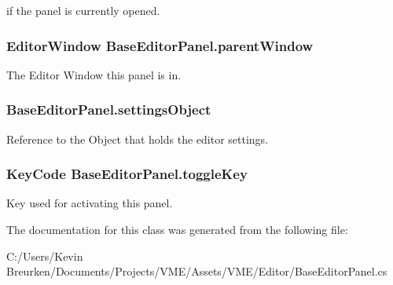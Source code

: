 if the panel is currently opened. 

\subsubsection[{\texorpdfstring{parent\+Window}{parentWindow}}]{\setlength{\rightskip}{0pt plus 5cm}Editor\+Window Base\+Editor\+Panel.\+parent\+Window}\hypertarget{class_base_editor_panel_a9b10134d16fca13b5c9b400ccbd06543}{}\label{class_base_editor_panel_a9b10134d16fca13b5c9b400ccbd06543}


The Editor Window this panel is in. 

\subsubsection[{\texorpdfstring{settings\+Object}{settingsObject}}]{ Base\+Editor\+Panel.\+settings\+Object}\hypertarget{class_base_editor_panel_a4b4881caa31e3604aaaa5f6914405e8a}{}\label{class_base_editor_panel_a4b4881caa31e3604aaaa5f6914405e8a}


Reference to the Object that holds the editor settings. 

\subsubsection[{\texorpdfstring{toggle\+Key}{toggleKey}}]{\setlength{\rightskip}{0pt plus 5cm}Key\+Code Base\+Editor\+Panel.\+toggle\+Key}\hypertarget{class_base_editor_panel_af34e3c07554a0c56901e6c9c6fe4d33c}{}\label{class_base_editor_panel_af34e3c07554a0c56901e6c9c6fe4d33c}


Key used for activating this panel. 



The documentation for this class was generated from the following file\+:\begin{DoxyCompactItemize}
\item 
C\+:/\+Users/\+Kevin Breurken/\+Documents/\+Projects/\+V\+M\+E/\+Assets/\+V\+M\+E/\+Editor/Base\+Editor\+Panel.\+cs\end{DoxyCompactItemize}
